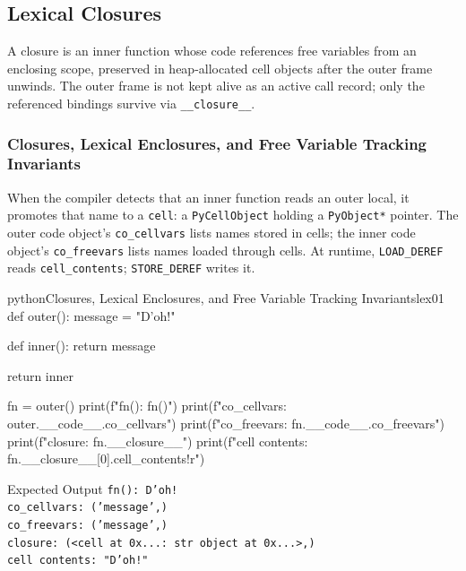 \subsection{Lexical Closures}

A closure is an inner function whose code references free variables from an enclosing scope, preserved in heap-allocated cell objects after the outer frame unwinds. The outer frame is not kept alive as an active call record; only the referenced bindings survive via \texttt{\_\_closure\_\_}.

\subsubsection{Closures, Lexical Enclosures, and Free Variable Tracking Invariants}

When the compiler detects that an inner function reads an outer local, it promotes that name to a \texttt{cell}: a \texttt{PyCellObject} holding a \texttt{PyObject*} pointer. The outer code object's \texttt{co\_cellvars} lists names stored in cells; the inner code object's \texttt{co\_freevars} lists names loaded through cells. At runtime, \texttt{LOAD\_DEREF} reads \texttt{cell\_contents}; \texttt{STORE\_DEREF} writes it.

\begin{codebox}[]{python}{Closures, Lexical Enclosures, and Free Variable Tracking Invariants}{lex01}
def outer():
    message = "D'oh!"

    def inner():
        return message

    return inner

fn = outer()
print(f"fn(): {fn()}")
print(f"co_cellvars: {outer.__code__.co_cellvars}")
print(f"co_freevars: {fn.__code__.co_freevars}")
print(f"closure: {fn.__closure__}")
print(f"cell contents: {fn.__closure__[0].cell_contents!r}")
\end{codebox}


\begin{iobox}{Expected Output}
\texttt{fn(): D'oh!} \\
\texttt{co\_cellvars: ('message',)} \\
\texttt{co\_freevars: ('message',)} \\
\texttt{closure: (<cell at 0x...: str object at 0x...>,)} \\
\texttt{cell contents: "D'oh!"} \\
\end{iobox}




